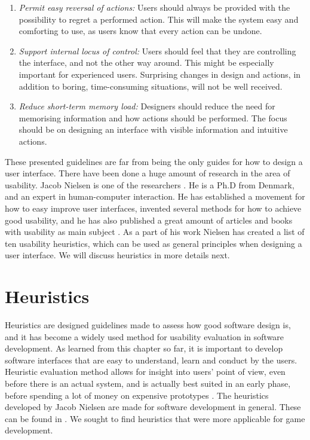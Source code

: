 \begin{enumerate}[{e}.1]
\item \emph{Permit easy reversal of actions:} Users should always be provided with the possibility to regret a performed action. This will make the system easy and comforting to use, as users know that every action can be undone. 
\item \emph{Support internal locus of control:} Users should feel that they are controlling the interface, and not the other way around. This might be especially important for experienced users. Surprising changes in design and actions, in addition to boring, time-consuming situations, will not be well received. 
\item \emph{Reduce short-term memory load:} Designers should reduce the need for memorising information and how actions should be performed. The focus should be on designing an interface with visible information and intuitive actions.
\end{enumerate}

These presented guidelines are far from being the only guides for how to design a user interface. There have been done a huge amount of research in the area of usability. Jacob Nielsen is one of the researchers \cite{nielsen2005ten}. He is a Ph.D from Denmark, and an expert in human-computer interaction. He has established a movement for how to easy improve user interfaces, invented several methods for how to achieve good usability, and he has also published a great amount of articles and books with usability as main subject \cite{JNielsen}. As a part of his work Nielsen has created a list of ten usability heuristics, which can be used as general principles when designing a user interface\cite{nielsen2005ten}. We will discuss heuristics in more details next.

\section{Heuristics}
\label{sec:heur}
Heuristics are designed guidelines made to assess how good software design is, and it has become a widely used method for usability evaluation in software development. As learned from this chapter so far, it is important to develop software interfaces that are easy to understand, learn and conduct by the users. Heuristic evaluation method allows for insight into users' point of view, even before there is an actual system, and is actually best suited in an early phase, before spending a lot of money on expensive prototypes \cite{desurvire}. The heuristics developed by Jacob Nielsen are made for software development in general. These can be found in \cite{nielsen2005ten}. We sought to find heuristics that were more applicable for game development. 

